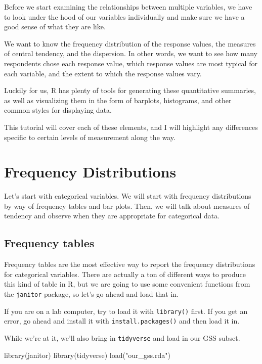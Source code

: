 \documentclass[
  letterpaper,
  DIV=11,
  numbers=noendperiod]{scrreprt}
\newenvironment{Shaded}{\begin{snugshade}}{\end{snugshade}}
\newcommand{\FunctionTok}[1]{\textcolor[rgb]{0.28,0.35,0.67}{#1}}
\newcommand{\NormalTok}[1]{\textcolor[rgb]{0.00,0.23,0.31}{#1}}
\newcommand{\StringTok}[1]{\textcolor[rgb]{0.13,0.47,0.30}{#1}}
\begin{document}
Before we start examining the relationships between multiple variables,
we have to look under the hood of our variables individually and make
sure we have a good sense of what they are like.

We want to know the frequency distribution of the response values, the
measures of central tendency, and the dispersion. In other words, we
want to see how many respondents chose each response value, which
response values are most typical for each variable, and the extent to
which the response values vary.

Luckily for us, R has plenty of tools for generating these quantitative
summaries, as well as visualizing them in the form of barplots,
histograms, and other common styles for displaying data.

This tutorial will cover each of these elements, and I will highlight
any differences specific to certain levels of measurement along the way.

\section{Frequency Distributions}\label{frequency-distributions}

Let's start with categorical variables. We will start with frequency
distributions by way of frequency tables and bar plots. Then, we will
talk about measures of tendency and observe when they are appropriate
for categorical data.

\subsection{Frequency tables}\label{frequency-tables}

Frequency tables are the most effective way to report the frequency
distributions for categorical variables. There are actually a ton of
different ways to produce this kind of table in R, but we are going to
use some convenient functions from the \texttt{janitor} package, so
let's go ahead and load that in.

If you are on a lab computer, try to load it with \texttt{library()}
first. If you get an error, go ahead and install it with
\texttt{install.packages()} and then load it in.

While we're at it, we'll also bring in \texttt{tidyverse} and load in
our GSS subset.

\begin{Shaded}
\begin{Highlighting}[]
\FunctionTok{library}\NormalTok{(janitor)}
\FunctionTok{library}\NormalTok{(tidyverse)}
\FunctionTok{load}\NormalTok{(}\StringTok{"our\_gss.rda"}\NormalTok{)}
\end{Highlighting}
\end{Shaded}
\end{document}
